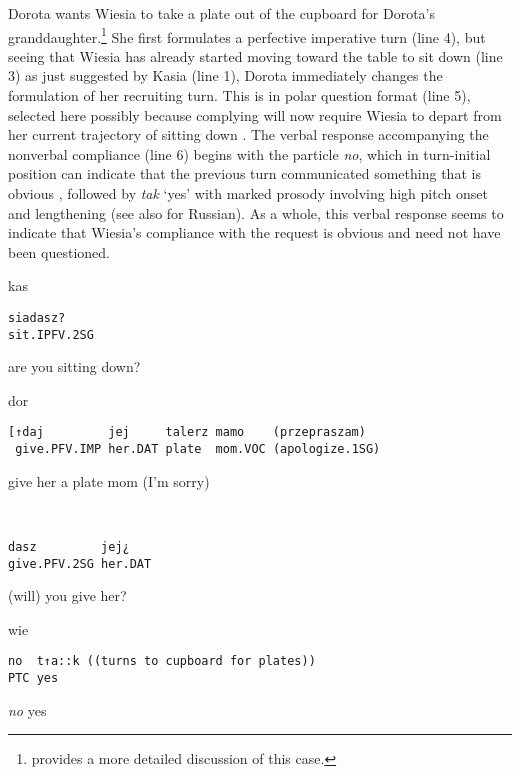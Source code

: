 \documentclass[output=paper]{langsci/langscibook}
\begin{document}
Dorota wants Wiesia to take a plate out of the cupboard for Dorota’s granddaughter.\footnote{\citet[chap. 4]{Zinken2016} provides a more detailed discussion of this case.} She first formulates a perfective imperative turn (line 4), but seeing that Wiesia has already started moving toward the table to sit down (line 3) as just suggested by Kasia (line 1), Dorota immediately changes the formulation of her recruiting turn.  This is in polar question format (line 5), selected here possibly because complying will now require Wiesia to depart from her current trajectory of sitting down \citep[see][]{Wootton1997,Rossi2012}.  The verbal response accompanying the nonverbal compliance (line 6) begins with the particle \textit{no}, which in turn-initial position can indicate that the previous turn communicated something that is obvious \citep{Weidner2013b}, followed by \textit{tak} `yes' with marked prosody involving high pitch onset and lengthening (see also \citealt{bolden2017} for Russian).  As a whole, this verbal response seems to indicate that Wiesia’s compliance with the request is obvious and need not have been questioned.

\vspace{2mm}
%
\begin{transbox}{1}{kas}
\begin{verbatim}
siadasz?
sit.IPFV.2SG
\end{verbatim}
are you sitting down?
\end{transbox}
%
%
\xtransbox{3}{wie}{[((starts moving towards table, then stops))}
%
\begin{mdframednoverticalspace}[style=firstfoc]
\begin{transbox}{4}{dor}
\begin{verbatim}
[↑daj         jej     talerz mamo    (przepraszam)
 give.PFV.IMP her.DAT plate  mom.VOC (apologize.1SG)
\end{verbatim}
\hspace{0.07cm} give her a plate mom (I’m sorry)
\end{transbox}
\end{mdframednoverticalspace}
%
\begin{mdframednoverticalspace}[style=firstfoc]
\begin{transbox}{5}{~}
\begin{verbatim}
dasz         jej¿
give.PFV.2SG her.DAT
\end{verbatim}
(will) you give her?
\end{transbox}
\end{mdframednoverticalspace}
%
\begin{mdframednoverticalspace}[style=secondfoc]
\begin{transbox}{6}{wie}
\begin{verbatim}
no  t↑a::k ((turns to cupboard for plates))
PTC yes
\end{verbatim}
\textit{no} yes
\end{transbox}
\end{mdframednoverticalspace}
%
\begin{mdframednoverticalspace}[style=secondfoc]
\end{mdframednoverticalspace}
\end{document}

